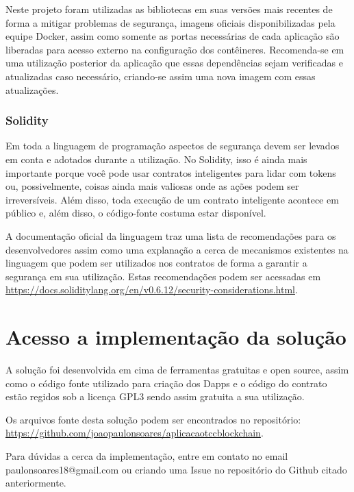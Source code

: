 Neste projeto foram utilizadas as bibliotecas em suas versões mais recentes de forma a mitigar problemas de segurança, imagens oficiais disponibilizadas pela equipe Docker, assim como somente as portas necessárias de cada aplicação são liberadas para acesso externo na configuração dos contêineres. Recomenda-se em uma utilização posterior da aplicação que essas dependências sejam verificadas e atualizadas caso necessário, criando-se assim uma nova imagem com essas atualizações.

\subsubsection{Solidity}

Em toda a linguagem de programação aspectos de segurança devem ser levados em conta e adotados durante a utilização. No Solidity, isso é ainda mais importante porque você pode usar contratos inteligentes para lidar com tokens ou, possivelmente, coisas ainda mais valiosas onde as ações podem ser irreversíveis. Além disso, toda execução de um contrato inteligente acontece em público e, além disso, o código-fonte costuma estar disponível.

A documentação oficial da linguagem traz uma lista de recomendações para os desenvolvedores assim como uma explanação a cerca de mecanismos existentes na linguagem que podem ser utilizados nos contratos de forma a garantir a segurança em sua utilização. Estas recomendações podem ser acessadas em \url{https://docs.soliditylang.org/en/v0.6.12/security-considerations.html}.




\section{Acesso a implementação da solução}
\label{sec:github}

A solução foi desenvolvida em cima de ferramentas gratuitas e open source, assim como o código fonte utilizado para criação dos Dapps e o código do contrato estão regidos sob a licença GPL3 sendo assim gratuita a sua utilização.

Os arquivos fonte desta solução podem ser encontrados no repositório:  \url{https://github.com/joaopaulonsoares/aplicacaotccblockchain}.

Para dúvidas a cerca da implementação, entre em contato no email paulonsoares18@gmail.com ou criando uma Issue no repositório do Github citado anteriormente.

